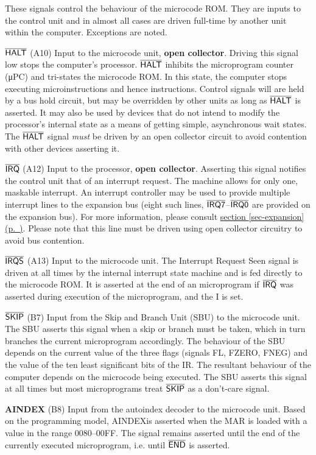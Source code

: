 \documentclass[11pt,a4paper,twocolumns]{article}
\newcommand{\cf}[2][section]{\hyperref[#2]{#1 \ref*{#2} (p.~\pageref*{#2})}}
\newcommand{\ns}[1]{$\overline{\mbox{\textsf{{#1}}}}$}
\newcommand{\ps}[1]{\textsf{#1}}
\newcommand\unit[1]{{#1}}
\newcommand\SBU{\unit{SBU}}
\newcommand\register[1]{\textsf{#1}}
\newcommand\Ireg{\register{I}}
\newcommand\MAR{\register{MAR}}
\newcommand\IR{\register{IR}}
\newcommand\HALT{\ns{HALT}}
\newcommand\END{\ns{END}}
\newcommand\IRQ{\ns{IRQ}}
\newcommand\IRQS{\ns{IRQS}}
\newcommand\IRQn[1]{\ns{IRQ{#1}}}
\newcommand\SKIP{\ns{SKIP}}
\newcommand\AINDEX{\ps{AINDEX}}
\newcommand\FL{\ps{FL}}
\newcommand\FZERO{\ps{FZERO}}
\newcommand\FNEG{\ps{FNEG}}
\begin{document}
These signals control the behaviour of the microcode ROM. They are
inputs to the control unit and in almost all cases are driven
full-time by another unit within the computer. Exceptions are noted.

\begin{description}
\item{\bf \HALT} (A10) Input to the microcode unit, \textbf{open
  collector}. Driving this signal low stops the computer's
  processor. \HALT{} inhibits the microprogram counter (\textsf{μPC})
  and tri-states the microcode ROM. In this state, the computer stops
  executing microinstructions and hence instructions. Control signals
  will are held by a bus hold circuit, but may be overridden by other
  units as long as \HALT{} is asserted. It may also be used by devices
  that do not intend to modify the processor's internal state as a
  means of getting simple, asynchronous wait states. The \HALT{}
  signal {\em must\/} be driven by an open collector circuit to avoid
  contention with other devices asserting it.
\item{\bf \IRQ} (A12) Input to the processor, \textbf{open
  collector}. Asserting this signal notifies the control unit that of
  an interrupt request. The machine allows for only one, maskable
  interrupt. An interrupt controller may be used to provide multiple
  interrupt lines to the expansion bus (eight such lines,
  \IRQn{7}–\IRQn{0} are provided on the expansion bus). For more
  information, please consult \cf{sec-expansion}. Please note that
  this line must be driven using open collector circuitry to avoid bus
  contention.
\item{\bf \IRQS} (A13) Input to the microcode unit. The Interrupt
  Request Seen signal is driven at all times by the internal interrupt
  state machine and is fed directly to the microcode ROM. It is
  asserted at the end of an microprogram if \IRQ{} was asserted during
  execution of the microprogram, and the \Ireg{} is set.
\item{\bf \SKIP} (B7) Input from the Skip and Branch Unit (\SBU) to
  the microcode unit. The \SBU{} asserts this signal when a skip or
  branch must be taken, which in turn branches the current
  microprogram accordingly. The behaviour of the \SBU{} depends on the
  current value of the three flags (signals \FL, \FZERO, \FNEG) and
  the value of the ten least significant bits of the \IR. The
  resultant behaviour of the computer depends on the microcode being
  executed. The \SBU{} asserts this signal at all times but most
  microprograms treat \SKIP{} as a don't-care signal.
\item{\bf \AINDEX} (B8) Input from the autoindex decoder to the
  microcode unit. Based on the programming model, \AINDEX is asserted
  when the \MAR{} is loaded with a value in the range 0080–00FF. The
  signal remains asserted until the end of the currently executed
  microprogram, i.e. until \END{} is asserted.
\end{description}
\end{document}
